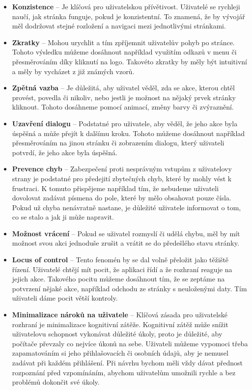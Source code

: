 \begin{itemize}
  \item \textbf{Konzistence} -- Je klíčová pro uživatelskou přívětivost. Uživatelé se rychleji naučí, jak stránka funguje, pokud je konzistentní. To znamená, že by vývojář měl dodržovat stejné rozložení a navigaci mezi jednotlivými stránkami.
  \item \textbf{Zkratky} -- Mohou urychlit a tím zpříjemnit uživatelův pohyb po stránce. Tohoto výsledku můžeme dosáhnout například využitím odkazů v menu či přesměrováním díky kliknutí na logo. Takovéto zkratky by měly být intuitivní a měly by vycházet z již známých vzorů.
  \item \textbf{Zpětná vazba} -- Je důležitá, aby uživatel věděl, zda se akce, kterou chtěl provést, povedla či nikoliv, nebo jestli je možnost na nějaký prvek stránky kliknout. Tohoto dosáhneme pomocí animací, změny barvy či zvýraznění.
  \item \textbf{Uzavření dialogu} -- Podstatné pro uživatele, aby věděl, že jeho akce byla úspěšná a může přejít k dalšímu kroku. Tohoto můžeme dosáhnout například přesměrováním na jinou stránku či zobrazením dialogu, který uživateli potvrdí, že jeho akce byla úspěšná.
  \item \textbf{Prevence chyb} -- Zabezpečení proti nesprávným vstupům z uživatelovy strany je podstatné pro předejití zbytečných chyb, které by mohly vést k frustraci. K tomuto přispějeme například tím, že nebudeme uživateli dovolovat zadávat písmena do pole, které by mělo obsahovat pouze čísla. Pokud už chyba nenávratně nastane, je důležité uživatele informovat o tom, co se stalo a jak ji může napravit.
  \item \textbf{Možnost vrácení} -- Pokud se uživatel rozmyslí či udělá chybu, měl by mít možnost svou akci jednoduše zrušit a vrátit se do předešlého stavu stránky.
  \item \textbf{Locus of control} -- Tento fenomén by se dal volně přeložit jako těžiště řízení. Uživatelé chtějí mít pocit, že aplikaci řídí a že rozhraní reaguje na jejich akce. Takového pocitu můžeme dosáhnout tím, že se zeptáme na potvrzení nějaké akce, například odchodu ze stránky s neuloženými daty. Tím uživateli dáme pocit větší kontroly.
  \item \textbf{Minimalizace nároků na uživatele} -- Klíčová zásada pro uživatelské rozhraní je minimalizace kognitivní zátěže. Kognitivní zátěž může snížit uživatelovu schopnost vykonávat důležité úkoly, proto je důležité, aby počítače převzaly co nejvíce úkonů na sebe. Uživateli můžeme vypomoci třeba zapamatováním si jeho přihlašovacích či osobních údajů, aby je nemusel zadávat při každém přihlášení. Při návrhu bychom měli vždy dávat přednost rozpoznání před vzpomínáním, abychom uživatelům umožnili rychle a bez problémů dokončit své úkoly.

\end{itemize}
